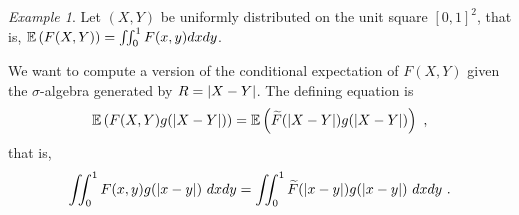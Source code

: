 \documentclass[12pt,a4paper]{amsart}
\theoremstyle{plain}%
\theoremstyle{definition}
\theoremstyle{remark}
\newtheorem{example}{Example}
\begin{document}
\begin{example}\label{ex:variogram}
Let $(X,Y)$ be uniformly distributed on the unit square $[0,1]^2$,
that is, $\operatorname{\mathbb E}\left(F(X,Y)\right) = \iint_0^1 F(x,y) dx dy$.

We want to compute a version of the conditional expectation of
$F(X,Y)$ given the $\sigma$-algebra generated by $R = \left\vert X-Y\right\vert$. The
defining equation is
\begin{equation*}
  \operatorname{\mathbb E}\left(F(X,Y)g(\left\vert X-Y\right\vert)\right) = \operatorname{\mathbb E}\left(\widetilde
  F(\left\vert X-Y\right\vert)g(\left\vert X-Y\right\vert)\right) \ ,
\end{equation*}
that is,
\begin{equation*}
  \iint_0^1 F(x,y)g(\left\vert x-y\right\vert) \ dx dy  = \iint_0^1 \widetilde
  F(\left\vert x-y\right\vert)g(\left\vert x-y\right\vert) \ dx dy \ .
\end{equation*}


\end{example}
\end{document}
